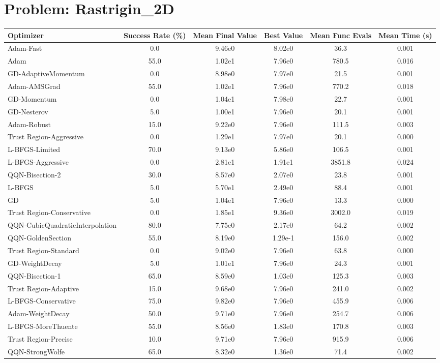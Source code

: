 \documentclass{article}
\begin{document}
\section{Problem: Rastrigin\_2D}
\begin{longtable}{p{3cm}*{5}{c}}
\toprule
\textbf{Optimizer} & \textbf{Success Rate (\%)} & \textbf{Mean Final Value} & \textbf{Best Value} & \textbf{Mean Func Evals} & \textbf{Mean Time (s)} \\
\midrule
Adam-Fast & 0.0 & 9.46e0 & 8.02e0 & 36.3 & 0.001 \\
Adam & 55.0 & 1.02e1 & 7.96e0 & 780.5 & 0.016 \\
GD-AdaptiveMomentum & 0.0 & 8.98e0 & 7.97e0 & 21.5 & 0.001 \\
Adam-AMSGrad & 55.0 & 1.02e1 & 7.96e0 & 770.2 & 0.018 \\
GD-Momentum & 0.0 & 1.04e1 & 7.98e0 & 22.7 & 0.001 \\
GD-Nesterov & 5.0 & 1.00e1 & 7.96e0 & 20.1 & 0.001 \\
Adam-Robust & 15.0 & 9.22e0 & 7.96e0 & 111.5 & 0.003 \\
Trust Region-Aggressive & 0.0 & 1.29e1 & 7.97e0 & 20.1 & 0.000 \\
L-BFGS-Limited & 70.0 & 9.13e0 & 5.86e0 & 106.5 & 0.001 \\
L-BFGS-Aggressive & 0.0 & 2.81e1 & 1.91e1 & 3851.8 & 0.024 \\
QQN-Bisection-2 & 30.0 & 8.57e0 & 2.07e0 & 23.8 & 0.001 \\
L-BFGS & 5.0 & 5.70e1 & 2.49e0 & 88.4 & 0.001 \\
GD & 5.0 & 1.04e1 & 7.96e0 & 13.3 & 0.000 \\
Trust Region-Conservative & 0.0 & 1.85e1 & 9.36e0 & 3002.0 & 0.019 \\
QQN-CubicQuadraticInterpolation & 80.0 & 7.75e0 & 2.17e0 & 64.2 & 0.002 \\
QQN-GoldenSection & 55.0 & 8.19e0 & 1.29e-1 & 156.0 & 0.002 \\
Trust Region-Standard & 0.0 & 9.02e0 & 7.96e0 & 63.8 & 0.000 \\
GD-WeightDecay & 5.0 & 1.01e1 & 7.96e0 & 24.3 & 0.001 \\
QQN-Bisection-1 & 65.0 & 8.59e0 & 1.03e0 & 125.3 & 0.003 \\
Trust Region-Adaptive & 15.0 & 9.68e0 & 7.96e0 & 241.0 & 0.002 \\
L-BFGS-Conservative & 75.0 & 9.82e0 & 7.96e0 & 455.9 & 0.006 \\
Adam-WeightDecay & 50.0 & 9.71e0 & 7.96e0 & 254.7 & 0.006 \\
L-BFGS-MoreThuente & 55.0 & 8.56e0 & 1.83e0 & 170.8 & 0.003 \\
Trust Region-Precise & 10.0 & 9.71e0 & 7.96e0 & 915.9 & 0.006 \\
QQN-StrongWolfe & 65.0 & 8.32e0 & 1.36e0 & 71.4 & 0.002 \\
\bottomrule
\end{longtable}
\end{document}
